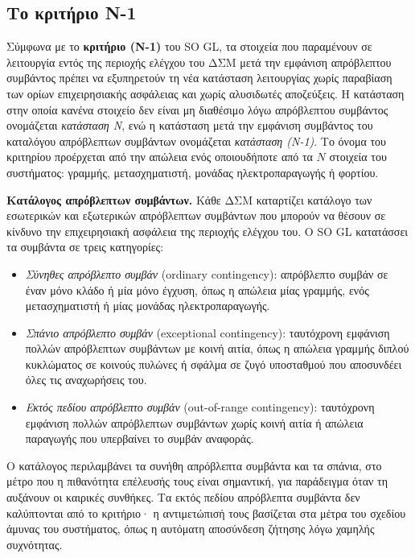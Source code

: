 \subsection{Το κριτήριο N-1}
\label{sec:n1}

Σύμφωνα με το \textbf{κριτήριο (N-1)} του SO GL, τα στοιχεία που παραμένουν σε λειτουργία
εντός της περιοχής ελέγχου του ΔΣΜ μετά την εμφάνιση απρόβλεπτου συμβάντος πρέπει να
εξυπηρετούν τη νέα κατάσταση λειτουργίας χωρίς παραβίαση των ορίων επιχειρησιακής ασφάλειας
και χωρίς αλυσιδωτές αποζεύξεις. Η κατάσταση στην οποία κανένα στοιχείο δεν είναι μη
διαθέσιμο λόγω απρόβλεπτου συμβάντος ονομάζεται \emph{κατάσταση N}, ενώ η κατάσταση μετά την
εμφάνιση συμβάντος του καταλόγου απρόβλεπτων συμβάντων ονομάζεται \emph{κατάσταση (N-1)}. Το
όνομα του κριτηρίου προέρχεται από την απώλεια ενός οποιουδήποτε από τα $N$ στοιχεία του
συστήματος: γραμμής, μετασχηματιστή, μονάδας ηλεκτροπαραγωγής ή φορτίου.

\textbf{Κατάλογος απρόβλεπτων συμβάντων.} Κάθε ΔΣΜ καταρτίζει κατάλογο των εσωτερικών και
εξωτερικών απρόβλεπτων συμβάντων που μπορούν να θέσουν σε κίνδυνο την επιχειρησιακή ασφάλεια
της περιοχής ελέγχου του. Ο SO GL κατατάσσει τα συμβάντα σε τρεις κατηγορίες:

\begin{itemize}
\item \emph{Σύνηθες απρόβλεπτο συμβάν} (ordinary contingency): απρόβλεπτο συμβάν σε έναν
      μόνο κλάδο ή μία μόνο έγχυση, όπως η απώλεια μίας γραμμής, ενός μετασχηματιστή ή μίας
      μονάδας ηλεκτροπαραγωγής.
\item \emph{Σπάνιο απρόβλεπτο συμβάν} (exceptional contingency): ταυτόχρονη εμφάνιση πολλών
      απρόβλεπτων συμβάντων με κοινή αιτία, όπως η απώλεια γραμμής διπλού κυκλώματος σε κοινούς
      πυλώνες ή σφάλμα σε ζυγό υποσταθμού που αποσυνδέει όλες τις αναχωρήσεις του.
\item \emph{Εκτός πεδίου απρόβλεπτο συμβάν} (out-of-range contingency): ταυτόχρονη εμφάνιση
      πολλών απρόβλεπτων συμβάντων χωρίς κοινή αιτία ή απώλεια παραγωγής που υπερβαίνει το
      συμβάν αναφοράς.
\end{itemize}

Ο κατάλογος περιλαμβάνει τα συνήθη απρόβλεπτα συμβάντα και τα σπάνια, στο μέτρο που η
πιθανότητα επέλευσής τους είναι σημαντική, για παράδειγμα όταν τη αυξάνουν οι καιρικές
συνθήκες. Τα εκτός πεδίου απρόβλεπτα συμβάντα δεν καλύπτονται από το κριτήριο· η
αντιμετώπισή τους βασίζεται στα μέτρα του σχεδίου άμυνας του συστήματος, όπως η αυτόματη
αποσύνδεση ζήτησης λόγω χαμηλής συχνότητας.

